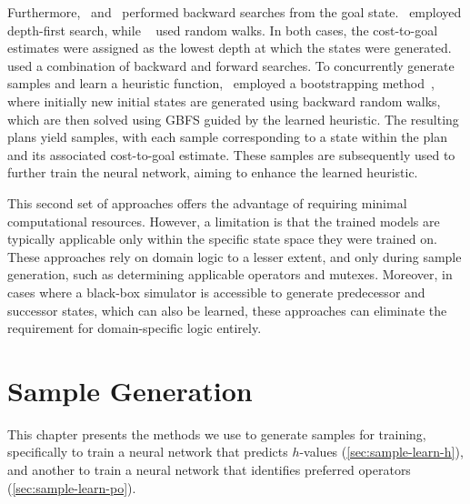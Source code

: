 \documentclass[ppgc,diss,english]{iiufrgs}
\begin{document}
Furthermore,~\citet{Yu.etal/2020} and~\citet{OToole/2022} performed backward searches from the goal state.~\citet{Yu.etal/2020} employed depth-first search, while ~\citet{OToole/2022} used random walks. In both cases, the cost-to-goal estimates were assigned as the lowest depth at which the states were generated.~\citet{Ferber.etal/2022} used a combination of backward and forward searches. To concurrently generate samples and learn a heuristic function,~\citet{Ferber.etal/2022} employed a bootstrapping method~\cite{Arfaee.etal/2011}, where initially new initial states are generated using backward random walks, which are then solved using GBFS guided by the learned heuristic. The resulting plans yield samples, with each sample corresponding to a state within the plan and its associated cost-to-goal estimate. These samples are subsequently used to further train the neural network, aiming to enhance the learned heuristic.

This second set of approaches offers the advantage of requiring minimal computational resources. However, a limitation is that the trained models are typically applicable only within the specific state space they were trained on. These approaches rely on domain logic to a lesser extent, and only during sample generation, such as determining applicable operators and mutexes. Moreover, in cases where a black-box simulator is accessible to generate predecessor and successor states, which can also be learned, these approaches can eliminate the requirement for domain-specific logic entirely.


%
%
\chapter{Sample Generation}
\label{cha:sample-gen}
This chapter presents the methods we use to generate samples for training, specifically to train a neural network that predicts $h$-values (\cref{sec:sample-learn-h}), and another to train a neural network that identifies preferred operators (\cref{sec:sample-learn-po}).
\end{document}
